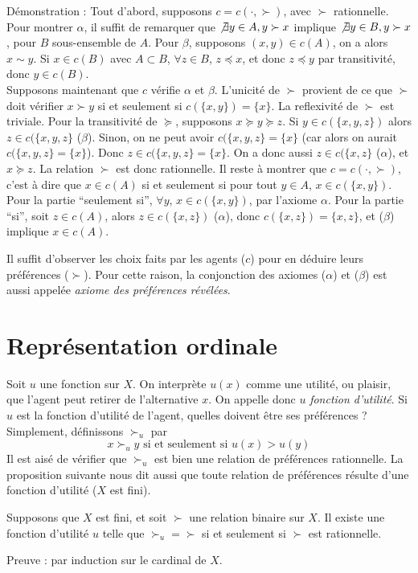  Démonstration : Tout d'abord, supposons $c=c(\cdot,\succ)$, avec $\succ$
rationnelle. Pour montrer $\alpha$, il suffit de remarquer que
$\not\exists y \in A, y\succ x$ implique $\not\exists y \in B,
y\succ x$, pour $B$ sous-ensemble de $A$. Pour $\beta$, supposons
$(x,y)\in c(A)$, on a alors $x\sim y$. Si $x\in c(B)$ avec
$A\subset B$, $\forall z\in B$, $z\preceq x$, et donc $z\preceq y$
par transitivité, donc $y\in c(B)$.\\
 Supposons maintenant que $c$ vérifie $\alpha$ et $\beta$.
L'unicité de $\succ$ provient de ce que $\succ$ doit vérifier
$x\succ y$ si et seulement si $c(\{x,y\})= \{x\}$. La reflexivité
de $\succ$ est triviale. Pour la transitivité de $\succeq$,
supposons $x\succeq y\succeq z$. Si $y\in c(\{x,y,z\})$ alors
$z\in c(\{x,y,z\}$ ($\beta$). Sinon, on ne peut avoir
$c(\{x,y,z\}=\{x\}$ (car alors on aurait $c(\{x,y,z\}=\{x\}$).
Donc $z\in c(\{x,y,z\}=\{x\}$. On a donc aussi $z\in c(\{x,z\}$
($\alpha$), et $x\succeq z$. La relation $\succ$ est donc
rationnelle. Il reste à montrer que $c=c(\cdot, \succ)$, c'est à
dire que $x\in c(A)$ si et seulement si pour tout $y\in A$, $x\in
c(\{x,y\})$. Pour la partie ``seulement si'', $\forall y$, $x\in
c(\{x,y\})$, par l'axiome $\alpha$. Pour la partie ``si'', soit
$z\in c(A)$, alors $z\in c(\{x,z\})$ ($\alpha$), donc $c(\{x,z\})=
\{x,z\}$, et ($\beta$) implique $x\in c(A)$.


Il suffit d'observer les choix faits par les agents ($c$) pour en
déduire leurs préférences ($\succ$). Pour cette raison, la
conjonction des axiomes ($\alpha$) et ($\beta$) est aussi appelée
{\em axiome des préférences révélées}.

\section{Représentation ordinale}
Soit $u$ une fonction sur $X$. On interprète $u(x)$ comme une
utilité, ou plaisir, que l'agent peut retirer de l'alternative
$x$. On appelle donc $u$ {\em fonction d'utilité}. Si $u$ est la
fonction d'utilité de l'agent, quelles doivent \^etre ses
préférences ? Simplement, définissons $\succ_u$ par
$$
x\succ_u y \mbox{ si et seulement si } u(x) > u(y)
$$
Il est aisé de vérifier que $\succ_u$ est bien une relation de
préférences rationnelle. La proposition suivante nous dit aussi
que toute relation de préférences résulte d'une fonction d'utilité
($X$ est fini).
\begin{proposition}\label{repsiXfini}
Supposons que $X$ est fini, et soit $\succ$ une relation binaire
sur $X$. Il existe une fonction d'utilité $u$ telle que $\succ_u =
\succ$ si et seulement si $\succ$ est rationnelle.
\end{proposition}
Preuve : par induction sur le cardinal de $X$.

